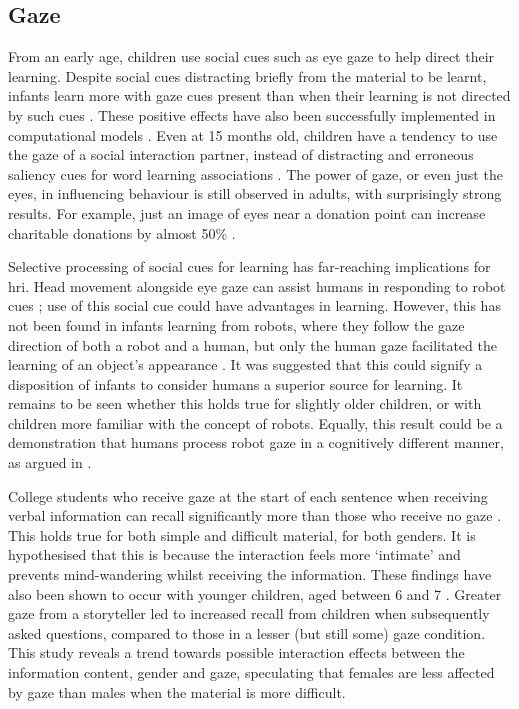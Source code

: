 \subsection{Gaze} \label{sec:background-gaze}
From an early age, children use social cues such as eye gaze to help direct their learning. Despite social cues distracting briefly from the material to be learnt, infants learn more with gaze cues present than when their learning is not directed by such cues \citep{wu2010social}. These positive effects have also been successfully implemented in computational models \citep{yu2007unified}. Even at 15 months old, children have a tendency to use the gaze of a social interaction partner, instead of distracting and erroneous saliency cues for word learning associations \citep{houston2006use}. The power of gaze, or even just the eyes, in influencing behaviour is still observed in adults, with surprisingly strong results. For example, just an image of eyes near a donation point can increase charitable donations by almost 50\% \citep{powell2012eye}.

Selective processing of social cues for learning has far-reaching implications for \acrshort{hri}. Head movement alongside eye gaze can assist humans in responding to robot cues \citep{boucher2010facilitative}; use of this social cue could have advantages in learning. However, this has not been found in infants learning from robots, where they follow the gaze direction of both a robot and a human, but only the human gaze facilitated the learning of an object's appearance \citep{okumura2013power}. It was suggested that this could signify a disposition of infants to consider humans a superior source for learning. It remains to be seen whether this holds true for slightly older children, or with children more familiar with the concept of robots. Equally, this result could be a demonstration that humans process robot gaze in a cognitively different manner, as argued in \cite{admoni2011robot}.

College students who receive gaze at the start of each sentence when receiving verbal information can recall significantly more than those who receive no gaze \citep{sherwood1987facilitative}. This holds true for both simple and difficult material, for both genders. It is hypothesised that this is because the interaction feels more `intimate' and prevents mind-wandering whilst receiving the information. These findings have also been shown to occur with younger children, aged between 6 and 7 \citep{otteson1979effect}. Greater gaze from a storyteller led to increased recall from children when subsequently asked questions, compared to those in a lesser (but still some) gaze condition. This study reveals a trend towards possible interaction effects between the information content, gender and gaze, speculating that females are less affected by gaze than males when the material is more difficult.

